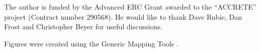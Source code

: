 \citep{WMSF2015}

\begin{acknowledgements}
The author is funded by the Advanced ERC Grant awarded to the ``ACCRETE'' project (Contract number 290568). He would like to thank Dave Rubie, Dan Frost and Christopher Beyer for useful discussions.

Figures were created using the Generic Mapping Tools \citep{GMT}.
\end{acknowledgements}







\grid
